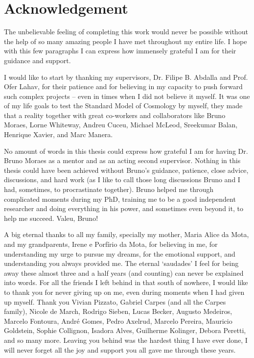 %
\chapter*{Acknowledgement}
\label{sec:acknowledgement}
\vspace*{-10mm}
The unbelievable feeling of completing this work would never be possible without the help of so many amazing people I have met throughout my entire life. I hope with this few paragraphs I can express how immensely grateful I am for their guidance and support.

\qquad I would like to start by thanking my supervisors, Dr. Filipe B. Abdalla and Prof. Ofer Lahav, for their patience and for believing in my capacity to push forward such complex projects -- even in times when I did not believe it myself. It was one of my life goals to test the Standard Model of Cosmology by myself, they made that a reality together with great co-workers and collaborators like Bruno Moraes, Lorne Whiteway, Andreu Cuceu, Michael McLeod, Sreekumar Balan, Henrique Xavier, and Marc Manera.

\qquad No amount of words in this thesis could express how grateful I am for having Dr. Bruno Moraes as a mentor and as an acting second supervisor. Nothing in this thesis could have been achieved without Bruno's guidance, patience, close advice, discussions, and hard work (as I like to call those long discussions Bruno and I had, sometimes, to procrastinate together). Bruno helped me through complicated moments during my PhD, training me to be a good independent researcher and doing everything in his power, and sometimes even beyond it, to help me succeed. Valeu, Bruno!

\qquad A big eternal thanks to all my family, specially my mother, Maria Alice da Mota, and my grandparents, Irene e Porf\'irio da Mota, for believing in me, for understanding my urge to pursue my dreams, for the emotional support, and understanding you always provided me. The eternal `saudades' I feel for being away these almost three and a half years (and counting) can never be explained into words. For all the friends I left behind in that south of nowhere, I would like to thank you for never giving up on me, even during moments when I had given up myself. Thank you Vivian Pizzato, Gabriel Carpes (and all the Carpes family), Nicole de March, Rodrigo Sieben, Lucas Becker, Augusto Medeiros, Marcelo Fontoura, Andr\'e Gomes, Pedro Axelrud, Marcelo Pereira, Mauricio Goldstein, Sophie Collignon, Isadora Alves, Guilherme Kolinger, Debora Peretti, and so many more. Leaving you behind was the hardest thing I have ever done, I will never forget all the joy and support you all gave me through these years.

